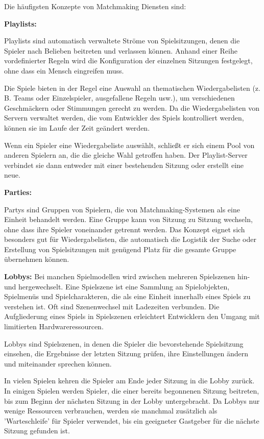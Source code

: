 Die häufigsten Konzepte von Matchmaking Diensten sind:

\textbf{Playlists:}

Playlists sind automatisch verwaltete Ströme von Spielsitzungen, denen die Spieler nach Belieben beitreten und verlassen können. Anhand einer Reihe vordefinierter Regeln wird die Konfiguration der einzelnen Sitzungen festgelegt, ohne dass ein Mensch eingreifen muss.  

Die Spiele bieten in der Regel eine Auswahl an thematischen Wiedergabelisten (z. B. Teams oder Einzelspieler, ausgefallene Regeln usw.), um verschiedenen Geschmäckern oder Stimmungen gerecht zu werden. Da die Wiedergabelisten von Servern verwaltet werden, die vom Entwickler des Spiels kontrolliert werden, können sie im Laufe der Zeit geändert werden.

Wenn ein Spieler eine Wiedergabeliste auswählt, schließt er sich einem Pool von anderen Spielern an, die die gleiche Wahl getroffen haben. Der Playlist-Server verbindet sie dann entweder mit einer bestehenden Sitzung oder erstellt eine neue. 

\cite{Wikipedia.2021b}

\textbf{Parties:}

Partys sind Gruppen von Spielern, die von Matchmaking-Systemen als eine Einheit behandelt werden. Eine Gruppe kann von Sitzung zu Sitzung wechseln, ohne dass ihre Spieler voneinander getrennt werden. Das Konzept eignet sich besonders gut für Wiedergabelisten, die automatisch die Logistik der Suche oder Erstellung von Spielsitzungen mit genügend Platz für die gesamte Gruppe übernehmen können.

\cite{Wikipedia.2021b} 

\textbf{Lobbys:}
Bei manchen Spielmodellen wird zwischen mehreren Spielszenen hin-und hergewechselt. Eine Spielszene ist eine Sammlung an Spielobjekten, Spielmenüs und Spielcharakteren, die als eine Einheit innerhalb eines Spiels zu verstehen ist. Oft sind Szenenwechsel mit Ladezeiten verbunden. Die Aufgliederung eines Spiels in Spielszenen erleichtert Entwicklern den Umgang mit limitierten Hardwareressourcen. \cite{Wikipedia.2012}

Lobbys sind Spielszenen, in denen die Spieler die bevorstehende Spielsitzung einsehen, die Ergebnisse der letzten Sitzung prüfen, ihre Einstellungen ändern und miteinander sprechen können.

In vielen Spielen kehren die Spieler am Ende jeder Sitzung in die Lobby zurück. In einigen Spielen werden Spieler, die einer bereits begonnenen Sitzung beitreten, bis zum Beginn der nächsten Sitzung in der Lobby untergebracht. Da Lobbys nur wenige Ressourcen verbrauchen, werden sie manchmal zusätzlich als 'Warteschleife' für Spieler verwendet, bis ein geeigneter Gastgeber für die nächste Sitzung gefunden ist.

